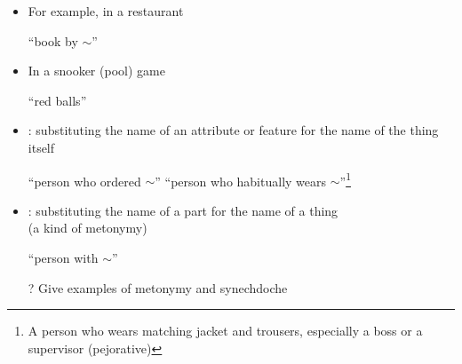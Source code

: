 \documentclass[a4paper,landscape,headrule,footrule,xetex]{foils}
\begin{document}

\begin{itemize}\addtolength{\itemsep}{-1.5ex}
\item For example, in a restaurant
  \begin{exe}
    \ex {} \textnormal{``book by $\sim$''}
  \end{exe}
\item In a snooker (pool)  game
  \begin{exe}
    \ex {} ``red balls''
  \end{exe}
\item {}: substituting the name of an attribute or feature for the name of the thing itself
  \begin{exe}
    \ex {} ``person who ordered $\sim$''
    \ex {} ``person who
    habitually wears $\sim$''\footnote{ A person who wears matching
      jacket and trousers, especially a boss or a supervisor (pejorative)}
  \end{exe}
  \item {}: substituting the name of a part for the name of a thing \\
    (a kind of metonymy)
  \begin{exe}
    \ex {} ``person with $\sim$''
  \end{exe}
\item[?] Give examples of metonymy and synechdoche\task

\end{itemize}
\end{document}
